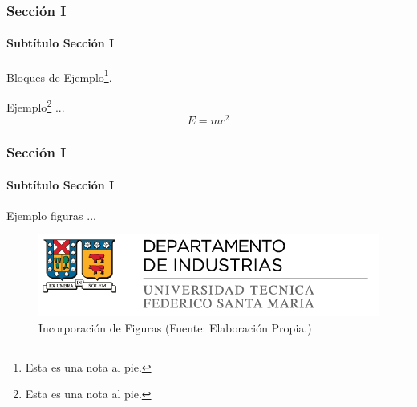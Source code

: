 \documentclass[
	9pt,
]{beamer}
\numberwithin{equation}{section}
\begin{document}
%
\begin{frame}
\frametitle{Sección I}
\framesubtitle{Subtítulo Sección I}
	Bloques de Ejemplo\footnote{Esta es una nota al pie.}.
	\begin{example}
	Ejemplo\footnote{Esta es una nota al pie.} ...
	\begin{equation*}
	E =mc^2
	\end{equation*}

	\end{example}
\end{frame}

%
\begin{frame}
\frametitle{Sección I}
\framesubtitle{Subtítulo Sección I}
	\begin{example}
	Ejemplo figuras ...
	
	\begin{figure}
	\centering
	\includegraphics[width=.85\textwidth]{figures/logoutfsmind_h.png}
	\caption{Incorporación de Figuras {\tiny (Fuente: Elaboración Propia.)}}
	\end{figure}
	
	\end{example}

\end{frame}
\end{document}
